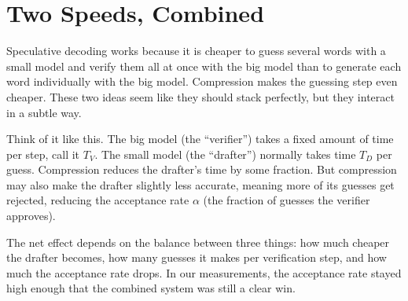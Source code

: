 \documentclass[11pt]{article}
\begin{document}
\hypertensorbanner

\begin{abstract}
\noindent
Language models generate text one word at a time, which is slow. Two tricks
can speed this up independently: compressing the model (Paper I) and using a
small draft model to guess several words ahead, then having the main model
check them all at once, called speculative decoding. This paper asks: what
happens when you combine both tricks at the same time?

We measured the combination on real hardware. With a compressed draft model
guessing 4 words ahead and a 38.5\% acceptance rate, the combined system hit
76.5 words per second, 1.53 times faster than generating one word at a time
without compression. We derived a simple formula that predicts the combined
speedup from three numbers: how much compression saves, how many guesses the
drafter makes, and how often the guesses are accepted. The formula matched
the measurements.

Along the way, we discovered and fixed a bug: when using greedy decoding
(always picking the most likely next word) with an instruction-tuned model,
the system can get stuck repeatedly generating an end-of-sentence marker.
The fix is two lines of code and is shipped in the runtime.
\end{abstract}

\section{Two Speeds, Combined}

Speculative decoding works because it is cheaper to guess several words with
a small model and verify them all at once with the big model than to generate
each word individually with the big model. Compression makes the guessing
step even cheaper. These two ideas seem like they should stack perfectly, but
they interact in a subtle way.

Think of it like this. The big model (the ``verifier'') takes a fixed amount
of time per step, call it $T_V$. The small model (the ``drafter'') normally
takes time $T_D$ per guess. Compression reduces the drafter's time by some
fraction. But compression may also make the drafter slightly less accurate,
meaning more of its guesses get rejected, reducing the acceptance rate
$\alpha$ (the fraction of guesses the verifier approves).

The net effect depends on the balance between three things: how much cheaper
the drafter becomes, how many guesses it makes per verification step, and
how much the acceptance rate drops. In our measurements, the acceptance rate
stayed high enough that the combined system was still a clear win.
\end{document}
